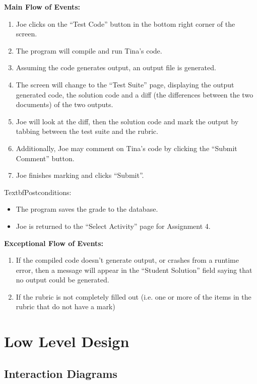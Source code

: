 \documentclass{article}
\begin{document}
\textbf{Main Flow of Events:}
\begin{enumerate} 
	\item Joe clicks on the “Test Code” button in the bottom right corner of the screen.
	\item The program will compile and run Tina’s  code.
	\item Assuming the code generates output, an output file is generated.
	\item The screen will change to the “Test Suite” page, displaying the output 
		generated code, the solution code and a diff (the differences between the 
		two documents) of the two outputs.
	\item Joe will look at the diff, then the solution code and mark the output by
		tabbing between the test suite and the rubric.	
	\item Additionally, Joe may comment on Tina’s code by 	clicking the “Submit 
		Comment” button.
	\item Joe finishes marking and clicks “Submit”.
\end{enumerate}

Textbf{Postconditions:}

\begin{itemize}
\item The program saves the grade to the database. 
\item Joe is returned to the “Select Activity” page for Assignment 4.
\end{itemize}

\textbf{Exceptional Flow of Events:}
\begin{enumerate}
 	\item If the compiled code doesn’t generate output, or crashes from a runtime 
 		error, then a message will appear in the “Student Solution” field saying that  
 		no output could be generated.
	\item If the rubric is not completely filled out (i.e. one or more of the items in the 
		rubric that do not have a mark)
\end{enumerate}

\section{Low Level Design}
\subsection{Interaction Diagrams}
\end{document}
